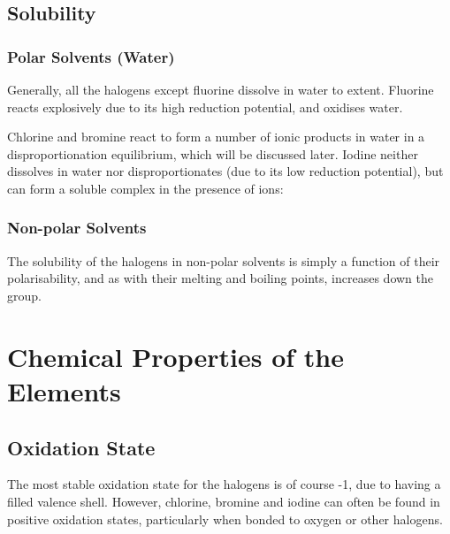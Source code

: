 

		\subsection{Solubility}

			\subsubsection{Polar Solvents (Water)}

				Generally, all the halogens except fluorine dissolve in water to  extent. Fluorine reacts explosively due to its high
				reduction potential, and oxidises water.

				Chlorine and bromine react to form a number of ionic products in water in a disproportionation equilibrium, which will be discussed
				later. Iodine neither dissolves in water nor disproportionates (due to its low reduction potential), but can form a 
				soluble complex  in the presence of  ions:




			\subsubsection{Non-polar Solvents}

				The solubility of the halogens in non-polar solvents is simply a function of their polarisability, and as with their melting and boiling
				points, increases down the group.




	\pagebreak
	\section{Chemical Properties of the Elements}

		\subsection{Oxidation State}

			The most stable oxidation state for the halogens is of course -1, due to having a filled valence shell. However, chlorine, bromine
			and iodine can often be found in positive oxidation states, particularly when bonded to oxygen or other halogens.

